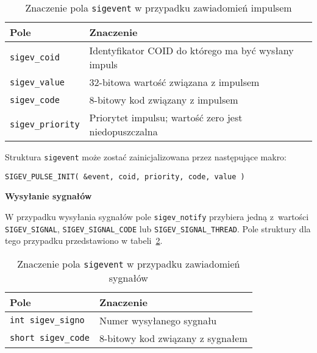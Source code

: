 \begin{table}[h!]
\centering
\caption{Znaczenie pola  \lstinline[style=MyCStyle]{sigevent} w przypadku zawiadomień impulsem}
\setlength{\arrayrulewidth}{1pt}
\setlength{\tabcolsep}{6pt}
\renewcommand{\arraystretch}{1.2}
\begin{tabular}{ |p{}|p{}|}
\hline \rowcolor{gray}
\textbf{Pole} & \textbf{Znaczenie} \\ \hline
\mbox{\lstinline[style=MyCStyle]{sigev_coid}} & Identyfikator COID do którego ma być wysłany impuls \\ \hline
\mbox{\lstinline[style=MyCStyle]{sigev_value}} & 32-bitowa wartość związana z impulsem \\ \hline
\mbox{\lstinline[style=MyCStyle]{sigev_code}} & 8-bitowy kod związany z impulsem \\ \hline
\mbox{\lstinline[style=MyCStyle]{sigev_priority}} & Priorytet impulsu; wartość zero jest niedopuszczalna \\ \hline
\end{tabular}
\label{tab:sigevent2}
\end{table}

Struktura \lstinline[style=MyCStyle]{sigevent} może zostać zainicjalizowana przez następujące makro:

\begin{lstlisting}[style=MyCStyle] 
SIGEV_PULSE_INIT( &event, coid, priority, code, value ) 
\end{lstlisting}


\noindent 
\textbf{Wysyłanie sygnałów}

W przypadku wysyłania sygnałów pole \lstinline[style=MyCStyle]{sigev_notify} przybiera jedną z~wartości \lstinline[style=MyCStyle]{SIGEV_SIGNAL}, \lstinline[style=MyCStyle]{SIGEV_SIGNAL_CODE} lub \lstinline[style=MyCStyle]{SIGEV_SIGNAL_THREAD}. Pole struktury dla tego przypadku przedstawiono w tabeli~\ref{tab:sigevent3}. 


\begin{table}[h!]
\centering
\caption{Znaczenie pola  \lstinline[style=MyCStyle]{sigevent} w przypadku zawiadomień sygnałów}
\setlength{\arrayrulewidth}{1pt}
\setlength{\tabcolsep}{6pt}
\renewcommand{\arraystretch}{1.2}
\begin{tabular}{ |p{}|p{}|}
\hline \rowcolor{gray}
\textbf{Pole} & \textbf{Znaczenie} \\ \hline
\mbox{\lstinline[style=MyCStyle]{int sigev_signo}} & Numer wysyłanego sygnału \\ \hline
\mbox{\lstinline[style=MyCStyle]{short sigev_code}} & 8-bitowy kod związany z sygnałem \\ \hline
\end{tabular}
\label{tab:sigevent3}
\end{table}


